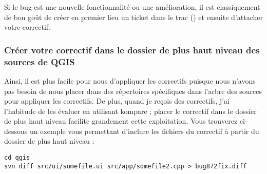 Si le bug est une nouvelle fonctionnalité ou une amélioration, il est classiquement de bon goût de créer en premier lieu un ticket dans le trac () et ensuite d'attacher votre correctif.

\subsubsection{Créer votre correctif dans le dossier de plus haut niveau des sources de QGIS}
Ainsi, il est plus facile pour nous d'appliquer les correctifs puisque nous n'avons pas besoin de nous placer dans des répertoires spécifiques dans l'arbre des sources pour appliquer les correctifs. De plus, quand je reçois des correctifs, j'ai l'habitude de les évaluer en utilisant kompare ; placer le correctif dans le dossier de plus haut niveau facilite grandement cette exploitation. Vous trouverez ci-dessous un exemple vous permettant d'inclure les fichiers du correctif à partir du dossier de plus haut niveau :

\begin{verbatim}
cd qgis
svn diff src/ui/somefile.ui src/app/somefile2.cpp > bug872fix.diff
\end{verbatim}

